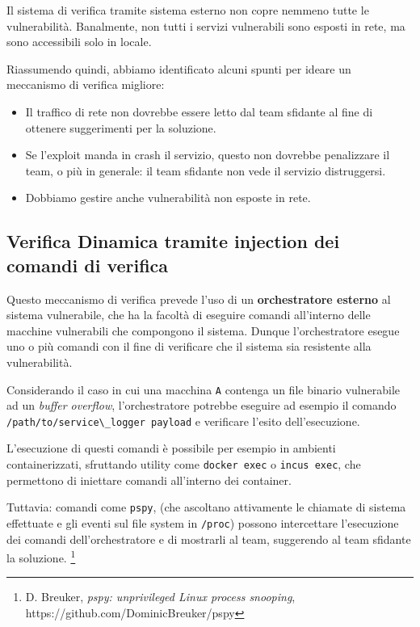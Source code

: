 Il sistema di verifica tramite sistema esterno non copre nemmeno tutte
le vulnerabilità. Banalmente, non tutti i servizi vulnerabili sono
esposti in rete, ma sono accessibili solo in locale.

Riassumendo quindi, abbiamo identificato alcuni spunti per ideare un
meccanismo di verifica migliore:

\begin{itemize}
\tightlist
\item
  Il traffico di rete non dovrebbe essere letto dal team sfidante al
  fine di ottenere suggerimenti per la soluzione.
\item
  Se l'exploit manda in crash il servizio, questo non dovrebbe
  penalizzare il team, o più in generale: il team sfidante non vede il
  servizio distruggersi.
\item
  Dobbiamo gestire anche vulnerabilità non esposte in rete.
\end{itemize}

\subsection{Verifica Dinamica tramite injection dei comandi di
verifica}\label{verifica-dinamica-tramite-injection-dei-comandi-di-verifica}

Questo meccanismo di verifica prevede l'uso di un \textbf{orchestratore
esterno} al sistema vulnerabile, che ha la facoltà di eseguire comandi
all'interno delle macchine vulnerabili che compongono il sistema. Dunque
l'orchestratore esegue uno o più comandi con il fine di verificare che
il sistema sia resistente alla vulnerabilità.

Considerando il caso in cui una macchina \passthrough{\lstinline!A!}
contenga un file binario vulnerabile ad un \emph{buffer overflow},
l'orchestratore potrebbe eseguire ad esempio il comando
\passthrough{\lstinline!/path/to/service\_logger payload!} e verificare
l'esito dell'esecuzione.

L'esecuzione di questi comandi è possibile per esempio in ambienti
containerizzati, sfruttando utility come
\passthrough{\lstinline!docker exec!} o
\passthrough{\lstinline!incus exec!}, che permettono di iniettare
comandi all'interno dei container.

Tuttavia: comandi come \passthrough{\lstinline!pspy!}, (che ascoltano
attivamente le chiamate di sistema effettuate e gli eventi sul file
system in \passthrough{\lstinline!/proc!}) possono intercettare
l'esecuzione dei comandi dell'orchestratore e di mostrarli al team,
suggerendo al team sfidante la soluzione. \footnote{\label{fn:ref_15}D. Breuker,
  \emph{pspy: unprivileged Linux process snooping},
  https://github.com/DominicBreuker/pspy}

